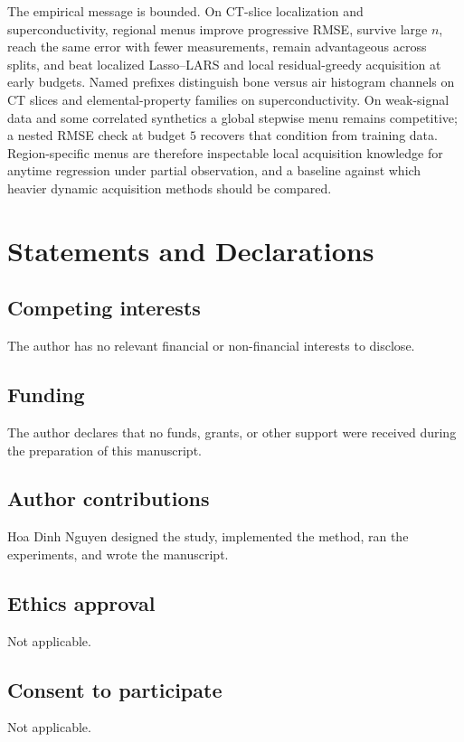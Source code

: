 \documentclass[pdflatex,sn-basic,Numbered]{sn-jnl}
\begin{document}
The empirical message is bounded. On CT-slice localization and superconductivity, regional menus improve progressive RMSE, survive large \(n\), reach the same error with fewer measurements, remain advantageous across splits, and beat localized Lasso--LARS and local residual-greedy acquisition at early budgets. Named prefixes distinguish bone versus air histogram channels on CT slices and elemental-property families on superconductivity. On weak-signal data and some correlated synthetics a global stepwise menu remains competitive; a nested RMSE check at budget \(5\) recovers that condition from training data. Region-specific menus are therefore inspectable local acquisition knowledge for anytime regression under partial observation, and a baseline against which heavier dynamic acquisition methods should be compared.

\backmatter

\section*{Statements and Declarations}

\subsection*{Competing interests}
The author has no relevant financial or non-financial interests to disclose.

\subsection*{Funding}
The author declares that no funds, grants, or other support were received during the preparation of this manuscript.

\subsection*{Author contributions}
Hoa Dinh Nguyen designed the study, implemented the method, ran the experiments, and wrote the manuscript.

\subsection*{Ethics approval}
Not applicable.

\subsection*{Consent to participate}
Not applicable.
\end{document}
